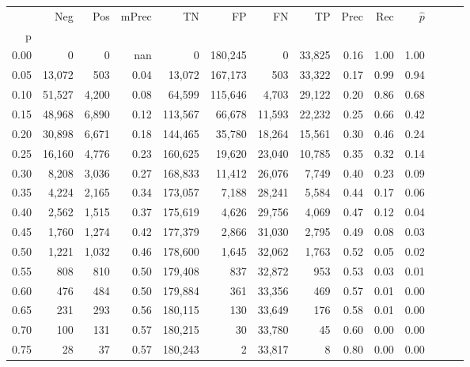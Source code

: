 \begin{tabular}{rrrrrrrrrrrrrr}
\toprule
{} &     Neg &    Pos & mPrec &       TN &       FP &      FN &      TP &  Prec &   Rec & $\hat{p}$ \\
p    &         &        &       &          &          &         &         &       &       &           \\
\midrule
0.00 &       0 &      0 &   nan &        0 &  180,245 &       0 &  33,825 &  0.16 &  1.00 &      1.00 \\
0.05 &  13,072 &    503 &  0.04 &   13,072 &  167,173 &     503 &  33,322 &  0.17 &  0.99 &      0.94 \\
0.10 &  51,527 &  4,200 &  0.08 &   64,599 &  115,646 &   4,703 &  29,122 &  0.20 &  0.86 &      0.68 \\
0.15 &  48,968 &  6,890 &  0.12 &  113,567 &   66,678 &  11,593 &  22,232 &  0.25 &  0.66 &      0.42 \\
0.20 &  30,898 &  6,671 &  0.18 &  144,465 &   35,780 &  18,264 &  15,561 &  0.30 &  0.46 &      0.24 \\
0.25 &  16,160 &  4,776 &  0.23 &  160,625 &   19,620 &  23,040 &  10,785 &  0.35 &  0.32 &      0.14 \\
0.30 &   8,208 &  3,036 &  0.27 &  168,833 &   11,412 &  26,076 &   7,749 &  0.40 &  0.23 &      0.09 \\
0.35 &   4,224 &  2,165 &  0.34 &  173,057 &    7,188 &  28,241 &   5,584 &  0.44 &  0.17 &      0.06 \\
0.40 &   2,562 &  1,515 &  0.37 &  175,619 &    4,626 &  29,756 &   4,069 &  0.47 &  0.12 &      0.04 \\
0.45 &   1,760 &  1,274 &  0.42 &  177,379 &    2,866 &  31,030 &   2,795 &  0.49 &  0.08 &      0.03 \\
0.50 &   1,221 &  1,032 &  0.46 &  178,600 &    1,645 &  32,062 &   1,763 &  0.52 &  0.05 &      0.02 \\
0.55 &     808 &    810 &  0.50 &  179,408 &      837 &  32,872 &     953 &  0.53 &  0.03 &      0.01 \\
0.60 &     476 &    484 &  0.50 &  179,884 &      361 &  33,356 &     469 &  0.57 &  0.01 &      0.00 \\
0.65 &     231 &    293 &  0.56 &  180,115 &      130 &  33,649 &     176 &  0.58 &  0.01 &      0.00 \\
0.70 &     100 &    131 &  0.57 &  180,215 &       30 &  33,780 &      45 &  0.60 &  0.00 &      0.00 \\
0.75 &      28 &     37 &  0.57 &  180,243 &        2 &  33,817 &       8 &  0.80 &  0.00 &      0.00 \\

\end{tabular}
